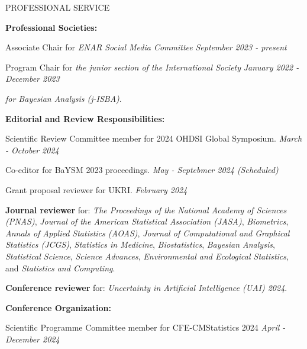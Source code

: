 \documentclass{resume} %
\newcommand{\thisYear}[1]{
	#1
}
\begin{document}
\begin{rSection}{PROFESSIONAL SERVICE}
	
	\hspace*{-0.2in}\textbf{Professional Societies:}
	
	\thisYear{
	Associate Chair for \emph{ENAR Social Media Committee}  \hfill {\em September 2023 - present}
}

		\smallskip
	
	Program Chair for \emph{the junior section of the International Society} \hfill {\em January 2022 - December 2023}
	
	\vspace{-0.1in}
	\emph{for Bayesian Analysis (j-ISBA)}.
	
\medskip 

 \hspace*{-0.2in}\textbf{Editorial and Review Responsibilities:}
 
 	Scientific Review Committee member for 2024 OHDSI Global Symposium. 	\hfill {\em March - October 2024}
 	
 	\smallskip 
	
		\thisYear{
 Co-editor for BaYSM 2023 proceedings.	\hfill {\em May - Septebmer 2024 (Scheduled)}
}

    \smallskip 
    
    	\thisYear{
    Grant proposal reviewer for UKRI.	\hfill {\em February 2024}
}
    
    \smallskip 
    
    \textbf{Journal reviewer} for: \emph{The Proceedings of the National Academy of Sciences (PNAS)}, \emph{Journal of the American Statistical Association (JASA)}, \emph{Biometrics}, \emph{Annals of Applied Statistics (AOAS)}, \emph{Journal of Computational and Graphical Statistics (JCGS)}, \emph{Statistics in Medicine}, \emph{Biostatistics}, \emph{Bayesian Analysis},  \emph{Statistical Science},  \emph{Science Advances}, \emph{Environmental and Ecological Statistics}, and \emph{Statistics and Computing}. 
    
    \smallskip 
    
    	\thisYear{
    \textbf{Conference reviewer} for: \emph{Uncertainty in Artificial Intelligence (UAI) 2024}. 
}
    
    \medskip 

 \hspace*{-0.2in}\textbf{Conference Organization:}
 
 	\thisYear{
 Scientific Programme Committee member for CFE-CMStatistics 2024 \hfill {\em April - December 2024}
}
 

\end{rSection}
\end{document}
